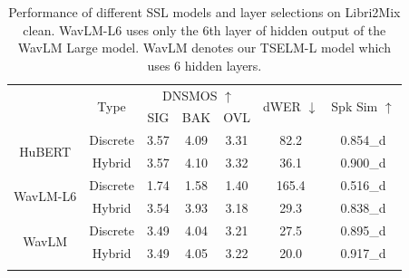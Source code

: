 \documentclass[conference]{IEEEtran}
\begin{document}
  \begin{table}
    \caption{Performance of different SSL models and layer selections on Libri2Mix clean. WavLM-L6 uses only the 6th layer of hidden output of the WavLM Large model. WavLM denotes our TSELM-L model which uses 6 hidden layers. 
            }
            \vspace{-15pt}
    \renewcommand{\arraystretch}{1.1}
    \begin{center}
      \setlength{\tabcolsep}{5pt}
        \begin{tabular}{ccccccc}
            \Xhline{2\arrayrulewidth} %
            \multirow{2}{*}{SSL-Model} & \multirow{2}{*}{Type} & \multicolumn{3}{c}{ DNSMOS $\uparrow$} & \multirow{2}{*}{dWER $\downarrow$} & \multirow{2}{*}{Spk Sim $\uparrow$} \\
            \cline{3-5}
                                                       &                             & SIG     & BAK     & OVL    &                       &                          \\ 
            \hline
            \multirow{2}{*}{HuBERT}                              &  Discrete                          & 3.57    & 4.09    & 3.31   & 82.2                & 0.854\_d                        \\
                                             &  Hybrid                          & 3.57    & 4.10    & 3.32   & 36.1                & 0.900\_d                        \\
            \hline
            \multirow{2}{*}{WavLM-L6}                              &  Discrete                          & 1.74    & 1.58    & 1.40   & 165.4                & 0.516\_d                        \\
            &  Hybrid                          & 3.54    & 3.93    & 3.18   & 29.3                & 0.838\_d                        \\
            \hline
            \multirow{2}{*}{WavLM}                                     &  Discrete                          & 3.49    & 4.04    & 3.21   & 27.5                & 0.895\_d                        \\
                                              &  Hybrid                          & 3.49    & 4.05    & 3.22   & 20.0                & 0.917\_d                        \\
            
            \Xhline{2\arrayrulewidth} %
            \end{tabular}
            \linebreak
            \label{hubert_wavlm_6}
      \end{center}
      \vspace{-8pt}
    \end{table}
\end{document}

